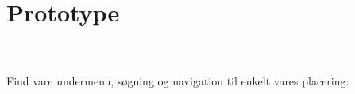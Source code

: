 \documentclass[12pt]{article}
\begin{document}
\section{Prototype}
 \\
\\
\noindent Find vare undermenu, søgning og navigation til enkelt vares placering:\\
\end{document}
